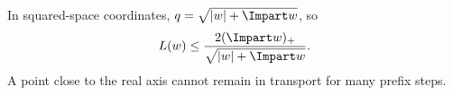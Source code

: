 In squared-space coordinates, $q=\sqrt{|w|+\Impart w}$, so
\begin{equation}
 L(w)
 \le
 \frac{2(\Impart w)_+}
 {\sqrt{|w|+\Impart w}}.
 \label{eq:L-w}
\end{equation}
A point close to the real axis cannot remain in transport for many prefix steps.


